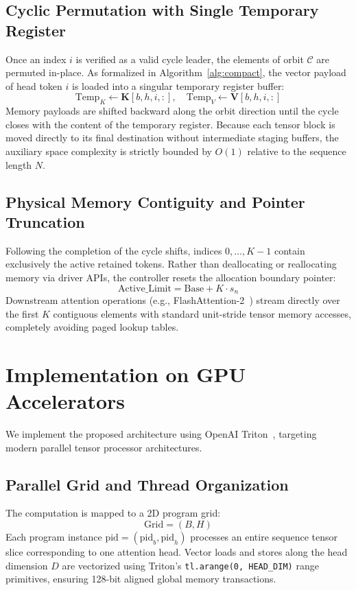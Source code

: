 \documentclass[journal,10pt,twocolumn]{article}
\begin{document}
\subsection{Cyclic Permutation with Single Temporary Register}
Once an index $i$ is verified as a valid cycle leader, the elements of orbit $\mathcal{C}$ are permuted in-place. As formalized in Algorithm~\ref{alg:compact}, the vector payload of head token $i$ is loaded into a singular temporary register buffer:
\begin{equation}
    \text{Temp}_K \gets \mathbf{K}[b, h, i, :], \quad \text{Temp}_V \gets \mathbf{V}[b, h, i, :]
\end{equation}
Memory payloads are shifted backward along the orbit direction until the cycle closes with the content of the temporary register. Because each tensor block is moved directly to its final destination without intermediate staging buffers, the auxiliary space complexity is strictly bounded by $O(1)$ relative to the sequence length $N$.


\subsection{Physical Memory Contiguity and Pointer Truncation}
Following the completion of the cycle shifts, indices $0, \dots, K-1$ contain exclusively the active retained tokens. Rather than deallocating or reallocating memory via driver APIs, the controller resets the allocation boundary pointer:
\begin{equation}
    \text{Active\_Limit} = \text{Base} + K \cdot s_n
\end{equation}
Downstream attention operations (e.g., FlashAttention-2~\cite{dao2023flashattention2}) stream directly over the first $K$ contiguous elements with standard unit-stride tensor memory accesses, completely avoiding paged lookup tables.

\section{Implementation on GPU Accelerators}
\label{sec:impl}

We implement the proposed architecture using OpenAI Triton~\cite{tillet2019triton}, targeting modern parallel tensor processor architectures.

\subsection{Parallel Grid and Thread Organization}
The computation is mapped to a 2D program grid:
\begin{equation}
    \text{Grid} = (B, H)
\end{equation}
Each program instance $\text{pid} = (\text{pid}_b, \text{pid}_h)$ processes an entire sequence tensor slice corresponding to one attention head. Vector loads and stores along the head dimension $D$ are vectorized using Triton's \texttt{tl.arange(0, HEAD\_DIM)} range primitives, ensuring 128-bit aligned global memory transactions.
\end{document}
